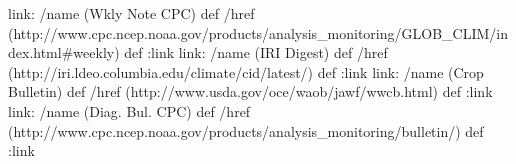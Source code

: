 
\begin{ingrid}

link:
/name (Wkly Note CPC) def
/href (http://www.cpc.ncep.noaa.gov/products/analysis_monitoring/GLOB_CLIM/index.html#weekly) def
:link
link:
/name (IRI Digest) def
/href (http://iri.ldeo.columbia.edu/climate/cid/latest/) def
:link
link:
/name (Crop Bulletin) def
/href (http://www.usda.gov/oce/waob/jawf/wwcb.html) def
:link
link:
/name (Diag. Bul. CPC) def
/href (http://www.cpc.ncep.noaa.gov/products/analysis_monitoring/bulletin/) def
:link

\end{ingrid}